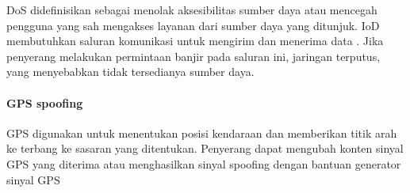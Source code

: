 DoS didefinisikan sebagai menolak aksesibilitas sumber daya atau mencegah pengguna yang sah mengakses layanan dari sumber daya yang ditunjuk. IoD membutuhkan saluran komunikasi untuk mengirim dan menerima data \citep{rodday2016exploring}. Jika penyerang melakukan permintaan banjir pada saluran ini, jaringan terputus, yang menyebabkan tidak tersedianya sumber daya.

\paragraph{GPS spoofing}
\label{par:gpsspoofing}

GPS digunakan untuk menentukan posisi kendaraan dan memberikan titik arah ke terbang ke sasaran yang ditentukan. Penyerang dapat mengubah konten sinyal GPS yang diterima atau menghasilkan sinyal spoofing dengan bantuan generator sinyal GPS
